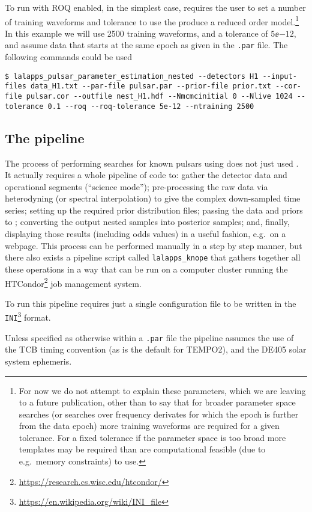 To run with ROQ enabled, in the simplest case, requires the user to set a number of training waveforms and tolerance to use the produce a reduced order
model.\footnote{For now we do not attempt to explain these parameters, which we are leaving to a future publication, other than to say that for broader
parameter space searches (or searches over frequency derivates for which the epoch is further from the data epoch) more training waveforms are required
for a given tolerance. For a fixed tolerance if the parameter space is too broad more templates may be required than are computational feasible (due to e.g.\
memory constraints) to use.} In this example we will use 2500 training waveforms, and a tolerance of $5\ee{-12}$, and assume data that starts at the same
epoch as given in the {\tt .par} file. The following commands could be used
\begin{lstlisting}[frame=single]
$ lalapps_pulsar_parameter_estimation_nested --detectors H1 --input-files data_H1.txt --par-file pulsar.par --prior-file prior.txt --cor-file pulsar.cor --outfile nest_H1.hdf --Nmcmcinitial 0 --Nlive 1024 --tolerance 0.1 --roq --roq-tolerance 5e-12 --ntraining 2500
\end{lstlisting}

\subsection{The pipeline}

The process of performing searches for known pulsars using does not just used \lppen. It actually requires a whole pipeline of code to: gather the \gw detector
data and operational segments (``science mode'');  pre-processing the raw data via heterodyning (or spectral interpolation) to give the complex down-sampled
time series; setting up the required prior distribution files; passing the data and priors to \lppen; converting the output nested samples into posterior samples;
and, finally, displaying those results (including odds values) in a useful fashion, e.g.\ on a webpage. This process can be performed manually in a step by step
manner, but there also exists a pipeline script called {\tt lalapps\_knope} that gathers together all these operations in a way that can be run on a computer
cluster running the HTCondor\footnote{\url{https://research.cs.wisc.edu/htcondor/}} job management system.

To run this pipeline requires just a single configuration file to be written in the {\tt INI}\footnote{\url{https://en.wikipedia.org/wiki/INI_file}} format.

Unless specified as otherwise within a {\tt .par} file the pipeline assumes the use of the TCB timing convention (as is the default for TEMPO2), and the DE405
solar system ephemeris.
